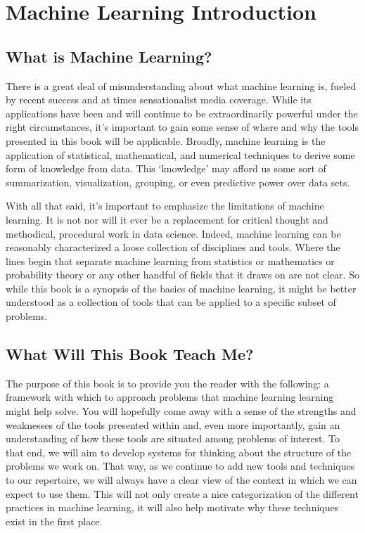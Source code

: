 \chapter{Machine Learning Introduction}

\section{What is Machine Learning?}
There is a great deal of misunderstanding about what machine learning is, fueled by recent success and at times sensationalist media coverage. While its applications have been and will continue to be extraordinarily powerful under the right circumstances, it's important to gain some sense of where and why the tools presented in this book will be applicable. Broadly, machine learning is the application of statistical, mathematical, and numerical techniques to derive some form of knowledge from data. This `knowledge' may afford us some sort of summarization, visualization, grouping, or even predictive power over data sets.

With all that said, it's important to emphasize the limitations of machine learning. It is not nor will it ever be a replacement for critical thought and methodical, procedural work in data science. Indeed, machine learning can be reasonably characterized a loose collection of disciplines and tools. Where the lines begin that separate machine learning from statistics or mathematics or probability theory or any other handful of fields that it draws on are not clear. So while this book is a synopsis of the basics of machine learning, it might be better understood as a collection of tools that can be applied to a specific subset of problems.

\section{What Will This Book Teach Me?}
The purpose of this book is to provide you the reader with the following: a framework with which to approach problems that machine learning learning might help solve. You will hopefully come away with a sense of the strengths and weaknesses of the tools presented within and, even more importantly, gain an understanding of how these tools are situated among problems of interest. To that end, we will aim to develop systems for thinking about the structure of the problems we work on. That way, as we continue to add new tools and techniques to our repertoire, we will always have a clear view of the context in which we can expect to use them. This will not only create a nice categorization of the different practices in machine learning, it will also help motivate why these techniques exist in the first place.

